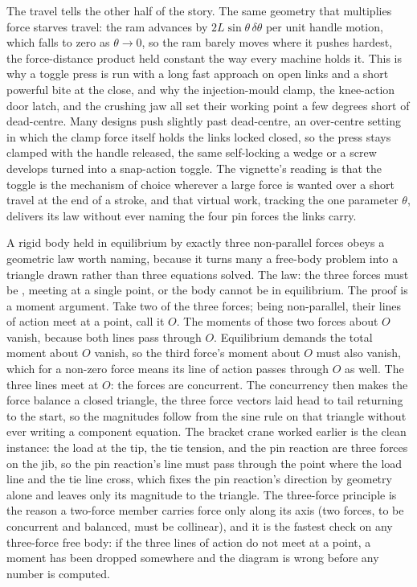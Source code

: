 The travel tells the other half of the story. The same geometry that multiplies
force starves travel: the ram advances by $2L\sin\theta\,\delta\theta$ per unit
handle motion, which falls to zero as $\theta \to 0$, so the ram barely moves
where it pushes hardest, the force-distance product held constant the way every
machine holds it. This is why a toggle press is run with a long fast approach on
open links and a short powerful bite at the close, and why the injection-mould
clamp, the knee-action door latch, and the crushing jaw all set their working
point a few degrees short of dead-centre. Many designs push slightly past
dead-centre, an over-centre setting in which the clamp force itself holds the
links locked closed, so the press stays clamped with the handle released, the
same self-locking a wedge or a screw develops turned into a snap-action toggle.
The vignette's reading is that the toggle is the mechanism of choice wherever a
large force is wanted over a short travel at the end of a stroke, and that
virtual work, tracking the one parameter $\theta$, delivers its law without ever
naming the four pin forces the links carry.

\begin{mastery}
A rigid body held in equilibrium by exactly three non-parallel forces obeys
a geometric law worth naming, because it turns many a free-body problem into
a triangle drawn rather than three equations solved. The law: the three
forces must be , meeting at a single point, or the body
cannot be in equilibrium. The proof is a moment argument. Take two of the
three forces; being non-parallel, their lines of action meet at a point, call
it $O$. The moments of those two forces about $O$ vanish, because both lines
pass through $O$. Equilibrium demands the total moment about $O$ vanish, so
the third force's moment about $O$ must also vanish, which for a non-zero
force means its line of action passes through $O$ as well. The three lines
meet at $O$: the forces are concurrent. The concurrency then makes the force
balance a closed triangle, the three force vectors laid head to tail
returning to the start, so the magnitudes follow from the sine rule on that
triangle without ever writing a component equation. The bracket crane worked
earlier is the clean instance: the load at the tip, the tie tension, and the
pin reaction are three forces on the jib, so the pin reaction's line must
pass through the point where the load line and the tie line cross, which
fixes the pin reaction's direction by geometry alone and leaves only its
magnitude to the triangle. The three-force principle is the reason a
two-force member carries force only along its axis (two forces, to be
concurrent and balanced, must be collinear), and it is the fastest check on
any three-force free body: if the three lines of action do not meet at a
point, a moment has been dropped somewhere and the diagram is wrong before
any number is computed.
\end{mastery}

